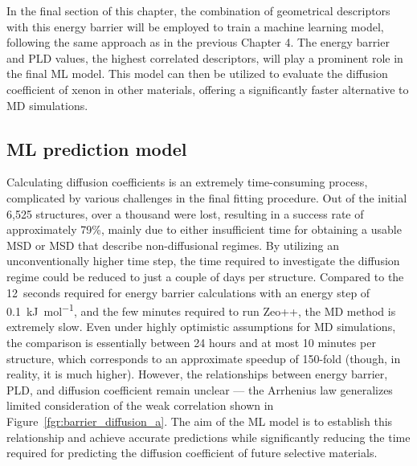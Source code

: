 \documentclass[main]{subfiles}
\begin{document}
In the final section of this chapter, the combination of geometrical descriptors with this energy barrier will be employed to train a machine learning model, following the same approach as in the previous Chapter 4. The energy barrier and PLD values, the highest correlated descriptors, will play a prominent role in the final ML model. This model can then be utilized to evaluate the diffusion coefficient of xenon in other materials, offering a significantly faster alternative to MD simulations.

\subsection{ML prediction model}

Calculating diffusion coefficients is an extremely time-consuming process, complicated by various challenges in the final fitting procedure. Out of the initial 6,525 structures, over a thousand were lost, resulting in a success rate of approximately 79\%, mainly due to either insufficient time for obtaining a usable MSD or MSD that describe non-diffusional regimes. By utilizing an unconventionally higher time step, the time required to investigate the diffusion regime could be reduced to just a couple of days per structure. Compared to the \SI{12}{seconds} required for energy barrier calculations with an energy step of \SI{0.1}{\kJ\per\mol}, and the few minutes required to run Zeo++, the MD method is extremely slow. Even under highly optimistic assumptions for MD simulations, the comparison is essentially between 24 hours and at most 10 minutes per structure, which corresponds to an approximate speedup of 150-fold (though, in reality, it is much higher). However, the relationships between energy barrier, PLD, and diffusion coefficient remain unclear --- the Arrhenius law generalizes limited consideration of the weak correlation shown in Figure~\ref{fgr:barrier_diffusion_a}. The aim of the ML model is to establish this relationship and achieve accurate predictions while significantly reducing the time required for predicting the diffusion coefficient of future selective materials.
\end{document}
